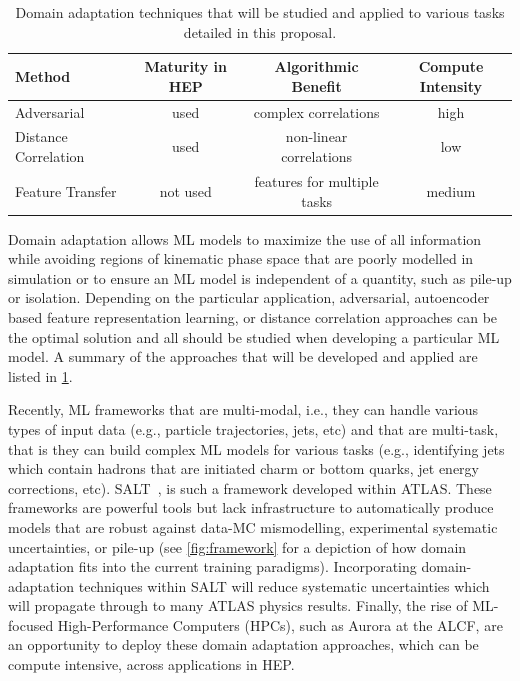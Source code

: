 \documentclass[letter, USenglish, 11pt, subfigure]{article}
\begin{document}
\begin{table}
  \caption{\label{tab:methods}Domain adaptation techniques that will be studied and applied to various tasks detailed in this proposal. }
  \begin{tabular}{|l|c|c|c|} \hline
    {\bf Method} & {\bf Maturity in HEP} & {\bf Algorithmic Benefit} & {\bf Compute Intensity} \\  \hline\hline 
    Adversarial & used & complex correlations & high \\ \hline
    Distance Correlation & used & non-linear correlations & low \\ \hline
    Feature Transfer & not used & features for multiple tasks  & medium \\ \hline\hline                                                                                                                                       
  \end{tabular}
\end{table}
Domain adaptation allows ML models to maximize the use of all information while avoiding regions of kinematic phase space that are poorly modelled in simulation or to ensure an ML model is independent of a quantity, such as pile-up or isolation. Depending on the particular application, adversarial, autoencoder based feature representation learning, or distance correlation approaches can be the optimal solution and all should be studied when developing a particular ML model. A summary of the approaches that will be developed and applied are listed in \cref{tab:methods}.

Recently, ML frameworks that are multi-modal, i.e., they can handle various types of input data (e.g., particle trajectories, jets, etc) and that are multi-task, that is they can build complex ML models for various tasks (e.g., identifying jets which contain hadrons that are initiated charm or bottom quarks, jet energy corrections, etc). SALT~\cite{salt}, is such a framework developed within ATLAS. These frameworks are powerful tools but lack infrastructure to automatically produce models that are robust against data-MC mismodelling, experimental systematic uncertainties, or pile-up (see \cref{fig:framework} for a depiction of how domain adaptation fits into the current training paradigms). Incorporating domain-adaptation techniques within SALT will reduce systematic uncertainties which will propagate through to many ATLAS physics results. Finally, the rise of ML-focused High-Performance Computers (HPCs), such as Aurora at the ALCF, are an opportunity to deploy these domain adaptation approaches, which can be compute intensive, across applications in HEP.
\end{document}
